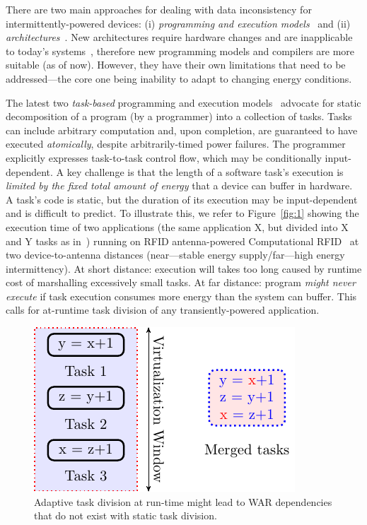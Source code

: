There are two main approaches for dealing with data inconsistency for intermittently-powered devices: (i) \emph{programming and execution models}~\cite{dino,ratchet,chain,alpaca} and (ii) \emph{architectures}~\cite{hicks_isca_2017,idetic,nvp,tictpl}. New architectures require hardware changes and are inapplicable to today's systems~\cite{hicks_isca_2017,nvp}, therefore new programming models and compilers are more suitable (as of now). However, they have their own limitations that need to be addressed---the core one being inability to adapt to changing energy conditions.

\textbf{} The latest two {\em task-based} programming and execution models~\cite{alpaca,chain} advocate for static decomposition of a program (by a programmer) into a collection of tasks. Tasks can include arbitrary computation and, upon completion, are guaranteed to have executed {\em atomically}, despite arbitrarily-timed power failures. The programmer explicitly expresses task-to-task control flow, which may be conditionally input-dependent. A key challenge is that the length of a software task's execution is \emph{limited by the fixed total amount of energy} that a device can buffer in hardware. A task's code is static, but the duration of its execution may be input-dependent and is difficult to predict. To illustrate this, we refer to Figure~\ref{fig:1} showing the execution time of two applications (the same application X, but divided into X and Y tasks as in~\cite{chain}) running on RFID antenna-powered Computational RFID~\cite{wisp,rf_powered_computing_gollakota_2014} at two device-to-antenna distances (near---stable energy supply/far---high energy intermittency). At short distance: execution will takes too long caused by runtime cost of marshalling excessively small tasks. At far distance: program \emph{might never execute} if task execution consumes more energy than the system can buffer. This calls for at-runtime  task division of any transiently-powered application.

\begin{figure}
	\includegraphics[width=0.6\columnwidth]{presentation/images/alpaca-war.pdf}
	\caption{\label{fig:virtualization}\color{blue} Adaptive task division at run-time might lead to WAR dependencies that do not exist with static task division.}
\end{figure}

